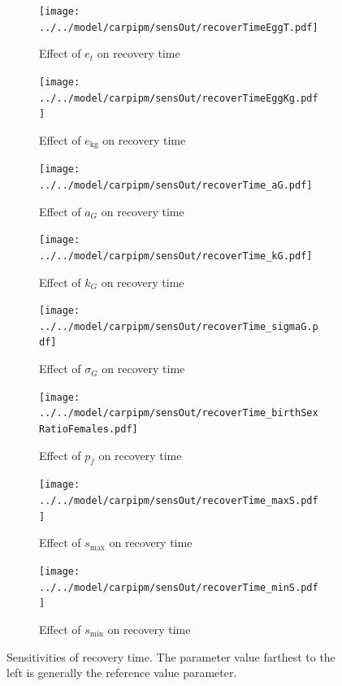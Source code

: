 \documentclass{article}[12pt]
\begin{document}
\begin{figure}[htbp]
	\centering
	\begin{subfigure}[b]{0.45\textwidth}
	   \texttt{[image: ../../model/carpipm/sensOut/recoverTimeEggT.pdf]} %
	   \caption{Effect of  \(e_t\) on recovery time}
	   \label{fig:ET_RT}
	\end{subfigure}
	\centering
	\begin{subfigure}[b]{0.45\textwidth}
	   \texttt{[image: ../../model/carpipm/sensOut/recoverTimeEggKg.pdf]} %
	   \caption{Effect of  \(e_\text{kg}\) on recovery time}
	   \label{fig:Ekg_RT}
	\end{subfigure}
	\begin{subfigure}[b]{0.45\textwidth}
	   \texttt{[image: ../../model/carpipm/sensOut/recoverTime\_aG.pdf]} %
	   \caption{Effect of  \(a_G\) on recovery time}
	   \label{fig:aG_RT}
	\end{subfigure}
	\begin{subfigure}[b]{0.45\textwidth}
	   \texttt{[image: ../../model/carpipm/sensOut/recoverTime\_kG.pdf]} %
	   \caption{Effect of  \(k_G\) on recovery time}
	   \label{fig:kG_RT}
	\end{subfigure}
	\begin{subfigure}[b]{0.45\textwidth}
	   \texttt{[image: ../../model/carpipm/sensOut/recoverTime\_sigmaG.pdf]} %
	   \caption{Effect of  \(\sigma_G\) on recovery time}
	   \label{fig:sigmaG_RT}
	\end{subfigure}
	\begin{subfigure}[b]{0.45\textwidth}
	   \texttt{[image: ../../model/carpipm/sensOut/recoverTime\_birthSexRatioFemales.pdf]} %
	   \caption{Effect of  \(p_f\) on recovery time}
	   \label{fig:pF_RT}
	\end{subfigure}	
	\begin{subfigure}[b]{0.45\textwidth}
	   \texttt{[image: ../../model/carpipm/sensOut/recoverTime\_maxS.pdf]} %
	   \caption{Effect of  \(s_\text{max}\) on recovery time}
	   \label{fig:maxS_RT}
	\end{subfigure}		
	\begin{subfigure}[b]{0.45\textwidth}
	   \texttt{[image: ../../model/carpipm/sensOut/recoverTime\_minS.pdf]} %
	   \caption{Effect of  \(s_\text{min}\) on recovery time}
	   \label{fig:minS_RT}
	\end{subfigure}		
     \caption{Sensitivities of  recovery time. The parameter value farthest to the left is generally the reference value parameter.}
   \label{fig:recoveryTimes}
\end{figure}
\end{document}
